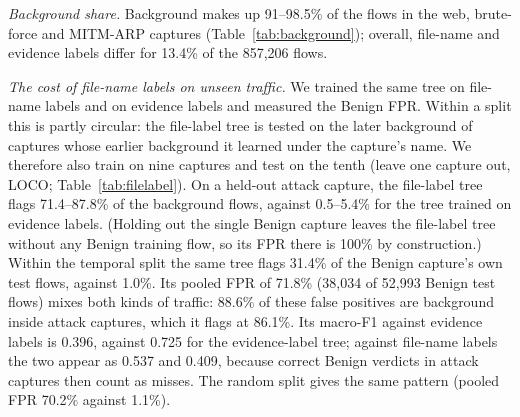 \emph{Background share.} Background makes up 91--98.5\% of the flows in the web, brute-force and MITM-ARP captures (Table~\ref{tab:background}); overall, file-name and evidence labels differ for 13.4\% of the 857,206 flows.

\emph{The cost of file-name labels on unseen traffic.} We trained the same tree on file-name labels and on evidence labels and measured the Benign FPR. Within a split this is partly circular: the file-label tree is tested on the later background of captures whose earlier background it learned under the capture's name. We therefore also train on nine captures and test on the tenth (leave one capture out, LOCO; Table~\ref{tab:filelabel}). On a held-out attack capture, the file-label tree flags 71.4--87.8\% of the background flows, against 0.5--5.4\% for the tree trained on evidence labels. (Holding out the single Benign capture leaves the file-label tree without any Benign training flow, so its FPR there is 100\% by construction.) Within the temporal split the same tree flags 31.4\% of the Benign capture's own test flows, against 1.0\%. Its pooled FPR of 71.8\% (38,034 of 52,993 Benign test flows) mixes both kinds of traffic: 88.6\% of these false positives are background inside attack captures, which it flags at 86.1\%. Its macro-F1 against evidence labels is 0.396, against 0.725 for the evidence-label tree; against file-name labels the two appear as 0.537 and 0.409, because correct Benign verdicts in attack captures then count as misses. The random split gives the same pattern (pooled FPR 70.2\% against 1.1\%).

